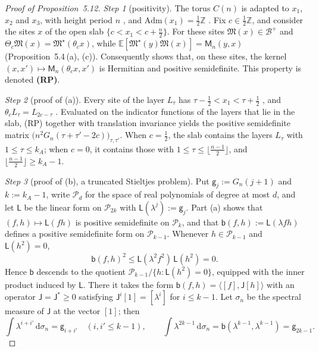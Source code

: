 \documentclass[11pt,letterpaper,reqno]{amsart}
\theoremstyle{definition}
\begin{document}
\begin{proof}[Proof of Proposition~5.12]
\emph{Step 1} (positivity).
The torus $C(n)$ is adapted to $x_1$, $x_2$ and $x_3$, with height period $n$ \cite[Section~1.1]{QEDII}, and $\mathrm{Adm}(x_1)=\frac12\mathbb Z$ \cite[Definition~2.2]{QEDII}.
Fix $c\in\frac12\mathbb Z$, and consider the sites $x$ of the open slab $\{c<x_1<c+\frac n2\}$.
For these sites $\mathfrak M(x)\in\mathcal B^+$ and $\Theta_c\mathfrak M(x)=\mathfrak M^\star(\theta_cx)$, while $\mathbb E[\mathfrak M^\star(y)\mathfrak M(x)]=\mathsf M_n(y,x)$ (Proposition~5.4\,(a), (c)).
Consequently \cite[Theorem~1.1\,(c)]{QEDII} shows that, on these sites, the kernel $(x,x')\mapsto\mathsf M_n(\theta_cx,x')$ is Hermitian and positive semidefinite.
This property is denoted \textbf{(RP)}.

\emph{Step 2} (proof of (a)).
Every site of the layer $L_\tau$ has $\tau-\frac12<x_1<\tau+\frac12$ \cite[Definition~2.4]{QEDII}, and $\theta_cL_\tau=L_{2c-\tau}$ \cite[Proposition~3.6\,(c)]{QEDII}.
Evaluated on the indicator functions of the layers that lie in the slab, (RP) together with translation invariance yields the positive semidefinite matrix $\bigl(n^2G_n(\tau+\tau'-2c)\bigr)_{\tau,\tau'}$.
When $c=\frac12$, the slab contains the layers $L_\tau$ with $1\le\tau\le k_A$; when $c=0$, it contains those with $1\le\tau\le\lfloor\frac{n-1}2\rfloor$, and $\lfloor\frac{n-1}2\rfloor\ge k_A-1$.

\emph{Step 3} (proof of (b), a truncated Stieltjes problem).
Put $\mathsf g_j:=G_n(j+1)$ and $k:=k_A-1$, write $\mathcal P_d$ for the space of real polynomials of degree at most $d$, and let $\mathsf L$ be the linear form on $\mathcal P_{2k}$ with $\mathsf L(\lambda^j):=\mathsf g_j$.
Part (a) shows that $(f,h)\mapsto\mathsf L(fh)$ is positive semidefinite on $\mathcal P_k$, and that $\mathsf b(f,h):=\mathsf L(\lambda fh)$ defines a positive semidefinite form on $\mathcal P_{k-1}$.
Whenever $h\in\mathcal P_{k-1}$ and $\mathsf L(h^2)=0$,
\begin{equation*}
\mathsf b(f,h)^2\le\mathsf L(\lambda^2f^2)\,\mathsf L(h^2)=0.
\end{equation*}
Hence $\mathsf b$ descends to the quotient $\mathcal P_{k-1}/\{h:\mathsf L(h^2)=0\}$, equipped with the inner product induced by $\mathsf L$.
There it takes the form $\mathsf b(f,h)=\langle[f],\mathsf J[h]\rangle$ with an operator $\mathsf J=\mathsf J^*\ge0$ satisfying $\mathsf J^i[1]=[\lambda^i]$ for $i\le k-1$.
Let $\sigma_n$ be the spectral measure of $\mathsf J$ at the vector $[1]$; then
\begin{equation*}
\int\lambda^{i+i'}\,\mathrm d\sigma_n=\mathsf g_{i+i'}\quad(i,i'\le k-1),\qquad\int\lambda^{2k-1}\,\mathrm d\sigma_n=\mathsf b(\lambda^{k-1},\lambda^{k-1})=\mathsf g_{2k-1}.
\end{equation*}


\end{proof}
\end{document}
